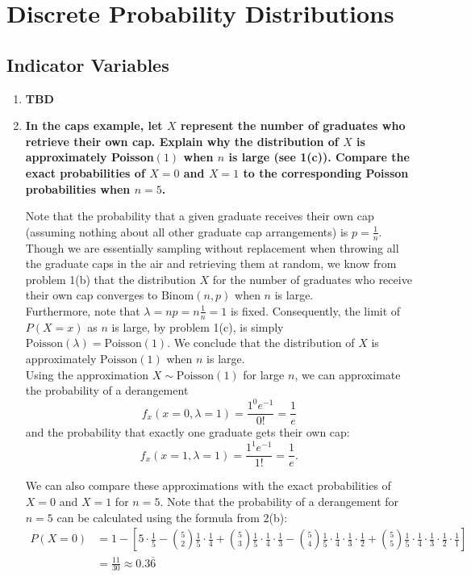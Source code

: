 \section{Discrete Probability Distributions}

\setcounter{subsection}{1}
\subsection{Indicator Variables}

\begin{enumerate}
    \item \textbf{TBD}

        
    \item \textbf{In the caps example, let $X$ represent the number of graduates who retrieve their own cap. Explain why the distribution of $X$ is approximately
    Poisson$(1)$ when $n$ is large (see 1(c)). Compare the exact probabilities of $X = 0$ and $X=1$ to the corresponding Poisson probabilities when $n=5$.}

    Note that the probability that a given graduate receives their own cap (assuming nothing about all other graduate cap arrangements) is $p = \frac{1}{n}$. Though we are essentially sampling without replacement when throwing all the graduate caps in the air and retrieving them at random, we know from problem 1(b) that the distribution $X$ for the number of graduates who receive their own cap converges to $\mathrm{Binom}(n, p)$ when $n$ is large. \\

    Furthermore, note that $\lambda = np = n\frac{1}{n} = 1$ is fixed. Consequently, the limit of $P(X = x)$ as $n$ is large, by problem 1(c), is simply $\mathrm{Poisson}(\lambda) = \mathrm{Poisson}(1)$. We conclude that the distribution of $X$ is approximately $\mathrm{Poisson}(1)$ when $n$ is large. \\

    Using the approximation $X \sim \mathrm{Poisson}(1)$ for large $n$, we can approximate the probability of a derangement
    \[ 
        f_x(x=0, \lambda = 1) = \frac{1^0 e^{-1}}{0!} = \frac{1}{e}
    \]
    and the probability that exactly one graduate gets their own cap:
    \[ 
        f_x(x=1, \lambda = 1) = \frac{1^1 e^{-1}}{1!} = \frac{1}{e}.
    \]

    We can also compare these approximations with the exact probabilities of $X=0$ and $X=1$ for $n=5$. Note that the probability of a derangement for $n=5$ can be calculated using the formula from 2(b):
    \begin{align*}
        P(X = 0)&= 1 - \left[ 5 \cdot \frac{1}{5} - \binom{5}{2}\frac{1}{5} \cdot \frac{1}{4} + 
        \binom{5}{3}\frac{1}{5} \cdot \frac{1}{4} \cdot \frac{1}{3} - \binom{5}{4}\frac{1}{5} \cdot \frac{1}{4} \cdot \frac{1}{3} \cdot \frac{1}{2}
        + \binom{5}{5}\frac{1}{5} \cdot \frac{1}{4} \cdot \frac{1}{3} \cdot \frac{1}{2} \cdot \frac{1}{1}\right] \\
        &= \frac{11}{30} \approx 0.3\overline{6}
    \end{align*}


\end{enumerate}
